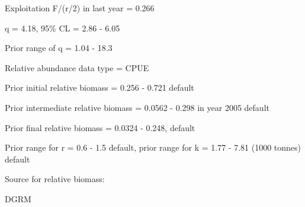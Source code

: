 \documentclass[12pt,a4paper]{article}\usepackage[]{graphicx}\usepackage[]{xcolor}
\begin{document}
Exploitation F/(r/2) in last year = 0.266

q = 4.18, 95\% CL = 2.86 - 6.05

Prior range of q = 1.04 - 18.3

Relative abundance data type = CPUE

Prior initial relative biomass = 0.256 - 0.721 default

Prior intermediate relative biomass = 0.0562 - 0.298 in year 2005 default

Prior final relative biomass = 0.0324 - 0.248, default

Prior range for r = 0.6 - 1.5 default, prior range for k = 1.77 - 7.81 (1000 tonnes) default

Source for relative biomass: 

DGRM

    
\end{document}
